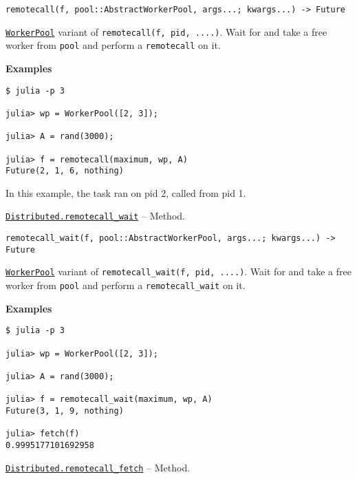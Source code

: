 \begin{adjustwidth}{2em}{0pt}


\begin{verbatim}
remotecall(f, pool::AbstractWorkerPool, args...; kwargs...) -> Future
\end{verbatim}

\hyperlink{17976394752057970100}{\texttt{WorkerPool}} variant of \texttt{remotecall(f, pid, ....)}. Wait for and take a free worker from \texttt{pool} and perform a \texttt{remotecall} on it.

\textbf{Examples}


\begin{verbatim}
$ julia -p 3

julia> wp = WorkerPool([2, 3]);

julia> A = rand(3000);

julia> f = remotecall(maximum, wp, A)
Future(2, 1, 6, nothing)
\end{verbatim}

In this example, the task ran on pid 2, called from pid 1.



\end{adjustwidth}
\hypertarget{17758067899551754536}{}
\hyperlink{17758067899551754536}{\texttt{Distributed.remotecall\_wait}}  -- {Method.}

\begin{adjustwidth}{2em}{0pt}


\begin{verbatim}
remotecall_wait(f, pool::AbstractWorkerPool, args...; kwargs...) -> Future
\end{verbatim}

\hyperlink{17976394752057970100}{\texttt{WorkerPool}} variant of \texttt{remotecall\_wait(f, pid, ....)}. Wait for and take a free worker from \texttt{pool} and perform a \texttt{remotecall\_wait} on it.

\textbf{Examples}


\begin{verbatim}
$ julia -p 3

julia> wp = WorkerPool([2, 3]);

julia> A = rand(3000);

julia> f = remotecall_wait(maximum, wp, A)
Future(3, 1, 9, nothing)

julia> fetch(f)
0.9995177101692958
\end{verbatim}



\end{adjustwidth}
\hypertarget{5219605386028398752}{}
\hyperlink{5219605386028398752}{\texttt{Distributed.remotecall\_fetch}}  -- {Method.}

